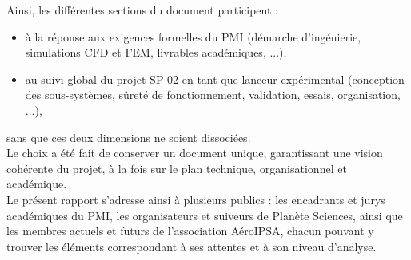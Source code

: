 Ainsi, les différentes sections du document participent :
\begin{itemize}
    \item à la réponse aux exigences formelles du \acrshort{PMI} (démarche d'ingénierie, simulations \acrshort{CFD} et
    \acrshort{FEM}, livrables académiques, ...),
    \item au suivi global du projet SP-02 en tant que lanceur expérimental (conception des sous-systèmes, sûreté de
    fonctionnement, validation, essais, organisation, ...),
\end{itemize}
sans que ces deux dimensions ne soient dissociées.\\

Le choix a été fait de conserver un document unique, garantissant une vision
cohérente du projet, à la fois sur le plan technique, organisationnel et académique.\\

Le présent rapport s'adresse ainsi à plusieurs publics : les encadrants et jurys académiques du \acrshort{PMI}, les organisateurs
et suiveurs de \gls{Planète Sciences}, ainsi que les membres actuels et futurs de l'association AéroIPSA, chacun pouvant y trouver
les éléments correspondant à ses attentes et à son niveau d'analyse.

\newpage